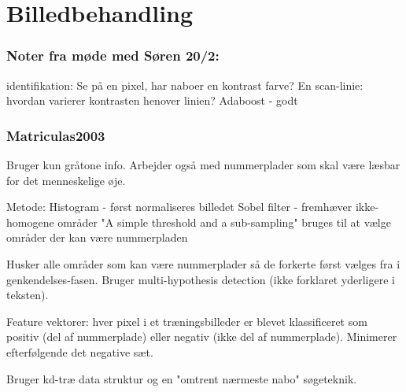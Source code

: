 \section{Billedbehandling}
\subsubsection*{Noter fra møde med Søren 20/2:}
identifikation: Se på en pixel, har naboer en kontrast farve?
En scan-linie: hvordan varierer kontrasten henover linien?
Adaboost - godt

\subsubsection*{Matriculas2003}
Bruger kun gråtone info. Arbejder også med nummerplader som skal være læsbar for det menneskelige øje.

Metode:
Histogram - først normaliseres billedet
Sobel filter - fremhæver ikke-homogene områder
"A simple threshold and a sub-sampling" bruges til at vælge områder der kan være nummerpladen

Husker alle områder som kan være nummerplader så de forkerte først vælges fra i genkendelses-fasen. Bruger multi-hypothesis detection (ikke forklaret yderligere i teksten).

Feature vektorer: hver pixel i et træningsbilleder er blevet klassificeret som positiv (del af nummerplade) eller negativ (ikke del af nummerplade). Minimerer efterfølgende det negative sæt.

Bruger kd-træ data struktur og en "omtrent nærmeste nabo" søgeteknik.